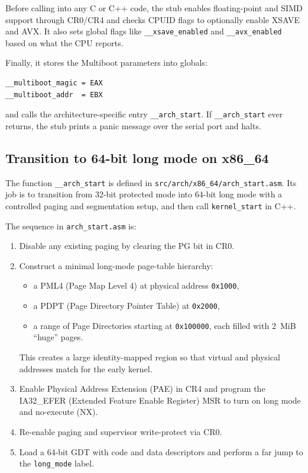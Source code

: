 \documentclass[a4paper,11pt]{article}
\begin{document}
Before calling into any C or C++ code, the stub enables floating-point
and SIMD support through CR0/CR4 and checks CPUID flags to optionally
enable XSAVE and AVX. It also sets global flags like \texttt{\_\_xsave\_enabled}
and \texttt{\_\_avx\_enabled} based on what the CPU reports.

Finally, it stores the Multiboot parameters into globals:

\begin{verbatim}
__multiboot_magic = EAX
__multiboot_addr  = EBX
\end{verbatim}

and calls the architecture-specific entry \texttt{\_\_arch\_start}. If
\texttt{\_\_arch\_start} ever returns, the stub prints a panic message
over the serial port and halts.

\subsection{Transition to 64-bit long mode on x86\_64}

The function \texttt{\_\_arch\_start} is defined in
\texttt{src/arch/x86\_64/arch\_start.asm}. Its job is to transition from
32-bit protected mode into 64-bit long mode with a controlled paging and
segmentation setup, and then call \texttt{kernel\_start} in C++.

The sequence in \texttt{arch\_start.asm} is:

\begin{enumerate}
  \item Disable any existing paging by clearing the PG bit in CR0.
  \item Construct a minimal long-mode page-table hierarchy:
    \begin{itemize}
      \item a PML4 (Page Map Level 4) at physical address
            \texttt{0x1000},
      \item a PDPT (Page Directory Pointer Table) at \texttt{0x2000},
      \item a range of Page Directories starting at \texttt{0x100000},
            each filled with 2~MiB ``huge'' pages.
    \end{itemize}
    This creates a large identity-mapped region so that virtual and
    physical addresses match for the early kernel.
  \item Enable Physical Address Extension (PAE) in CR4 and program the
        IA32\_EFER (Extended Feature Enable Register) MSR to turn on
        long mode and no-execute (NX).
  \item Re-enable paging and supervisor write-protect via CR0.
  \item Load a 64-bit GDT with code and data descriptors and perform a
        far jump to the \texttt{long\_mode} label.
\end{enumerate}
\end{document}

